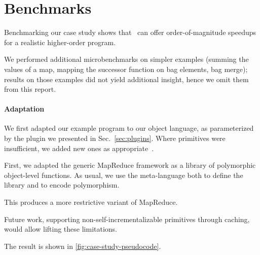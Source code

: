 \section{Benchmarks}

Benchmarking our case study shows
that \ILC\ can offer order-of-magnitude speedups for a
realistic higher-order program.

\begin{oldSec} %
We performed additional microbenchmarks on simpler examples
(summing the values of a map, mapping the successor function on bag elements, bag
merge);
results on those examples did not yield additional insight, hence
we omit them from this report.

\paragraph{Adaptation}
We first adapted our example program to our object language,
as parameterized by the plugin we presented in
Sec.~\ref{sec:plugins}. Where primitives were insufficient, we
added new ones as appropriate~.

First, we adapted the generic MapReduce framework as a library of
polymorphic object-level functions. As usual, we use the
meta-language both to define the library and to encode
polymorphism.

This produces a more restrictive variant of MapReduce. 

Future work, supporting non-self-incrementalizable primitives through caching, would allow lifting these limitations.

The result is shown in \cref{fig:case-study-pseudocode}.
\end{oldSec}
